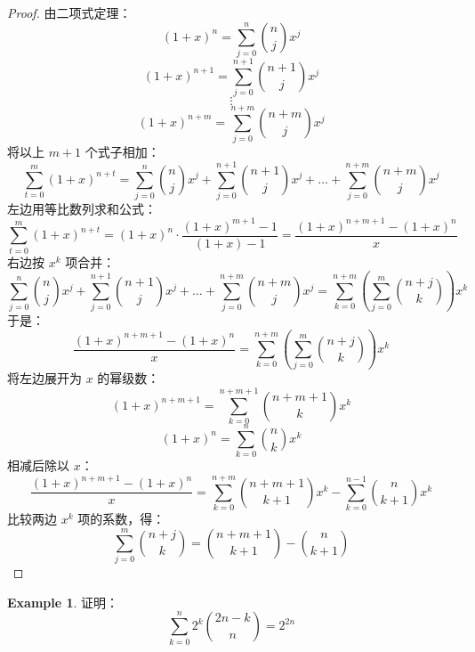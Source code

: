\documentclass[oneside]{book}
\theoremstyle{definition}
\newtheorem{example}{Example}[section]
\begin{document}
\begin{proof}
	由二项式定理：
	\[
	(1+x)^n = \sum_{j=0}^n \binom{n}{j}x^j
	\]
	\[
	(1+x)^{n+1} = \sum_{j=0}^{n+1} \binom{n+1}{j}x^j
	\]
	\[
	\vdots
	\]
	\[
	(1+x)^{n+m} = \sum_{j=0}^{n+m} \binom{n+m}{j}x^j
	\]
	将以上 \( m+1 \) 个式子相加：
	\[
	\sum_{t=0}^m (1+x)^{n+t} = \sum_{j=0}^n \binom{n}{j}x^j + \sum_{j=0}^{n+1} \binom{n+1}{j}x^j + \dots + \sum_{j=0}^{n+m} \binom{n+m}{j}x^j
	\]
	左边用等比数列求和公式：
	\[
	\sum_{t=0}^m (1+x)^{n+t} = (1+x)^n \cdot \frac{(1+x)^{m+1} - 1}{(1+x) - 1} = \frac{(1+x)^{n+m+1} - (1+x)^n}{x}
	\]
	右边按 \( x^k \) 项合并：
	\[
	\sum_{j=0}^n \binom{n}{j}x^j + \sum_{j=0}^{n+1} \binom{n+1}{j}x^j + \dots + \sum_{j=0}^{n+m} \binom{n+m}{j}x^j = \sum_{k=0}^{n+m} \left( \sum_{j=0}^m \binom{n+j}{k} \right) x^k
	\]
	于是：
	\[
	\frac{(1+x)^{n+m+1} - (1+x)^n}{x} = \sum_{k=0}^{n+m} \left( \sum_{j=0}^m \binom{n+j}{k} \right) x^k
	\]
	将左边展开为 \( x \) 的幂级数：
	\[
	(1+x)^{n+m+1} = \sum_{k=0}^{n+m+1} \binom{n+m+1}{k}x^k
	\]
	\[
	(1+x)^n = \sum_{k=0}^n \binom{n}{k}x^k
	\]
	相减后除以 \( x \)：
	\[
	\frac{(1+x)^{n+m+1} - (1+x)^n}{x} = \sum_{k=0}^{n+m} \binom{n+m+1}{k+1}x^k - \sum_{k=0}^{n-1} \binom{n}{k+1}x^k
	\]
	比较两边 \( x^k \) 项的系数，得：
	\[
	\sum_{j=0}^m \binom{n+j}{k} = \binom{n+m+1}{k+1} - \binom{n}{k+1}
	\]
\end{proof}


\begin{example}
	证明：\[ \sum_{k=0}^{n} 2^k \binom{2n - k}{n} = 2^{2n} \]
\end{example}
\end{document}
